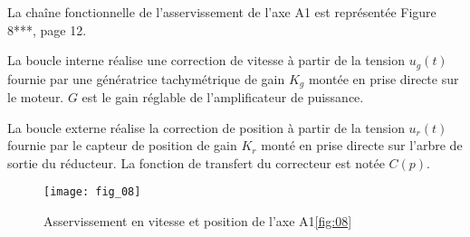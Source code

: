 La chaîne fonctionnelle de l’asservissement de l’axe A1 est représentée Figure 8***, page 12. 

La boucle interne réalise une correction de vitesse à partir de la tension $u_g(t)$ fournie par une 
génératrice tachymétrique de gain $K_g$ montée en prise directe sur le moteur. $G$ est le gain 
réglable de l’amplificateur de puissance. 


La boucle externe réalise la correction de position à partir de la tension $u_r(t)$ fournie par le 
capteur de position de gain $K_r$ monté en prise directe sur l’arbre de sortie du réducteur. La 
fonction de transfert du correcteur est notée $C(p)$.


\begin{figure}[H]
\centering
\texttt{[image: fig\_08]}
\caption{Asservissement en vitesse et position de l’axe A1\ref{fig:08}}
\end{figure}